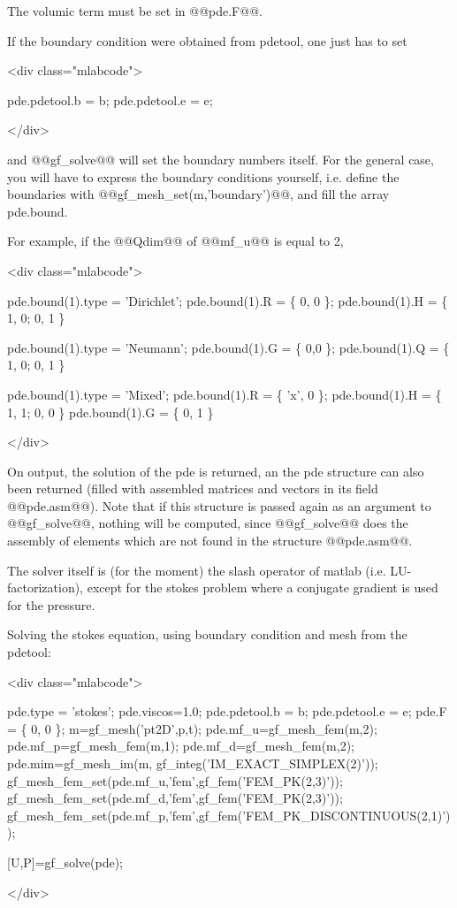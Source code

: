 \documentclass[11pt,a4paper]{article}
\newcommand{\sf}[1]{#1}
\newenvironment{mcode}{\begin{rawxml}<div class="mlabcode">\end{rawxml}\begin{example}}{\end{example}\begin{rawxml}</div>\end{rawxml}}
\newenvironment{mcode}{\begin{alltt}}{\end{alltt}}
\newcommand{\mlab}{{\sf matlab}\xspace}
\newcommand{\pdetool}{{\sf pdetool}\xspace}
\begin{document}
\begin{cmddescription}
  The volumic term must be set in @@pde.F@@.

  If the boundary condition were obtained from \pdetool, one just has to set
  \begin{mcode}
pde.pdetool.b = b;       
pde.pdetool.e = e;
  \end{mcode}
  and @@gf_solve@@ will set the boundary numbers itself.  For the
  general case, you will have to express the boundary conditions
  yourself, i.e. define the boundaries with
  @@gf_mesh_set(m,'boundary')@@, and fill the array pde.bound.

  For example, if the @@Qdim@@ of @@mf_u@@ is equal to 2,
  \begin{mcode}
pde.bound(1).type = 'Dirichlet';
pde.bound(1).R = \{ 0, 0 \};
pde.bound(1).H = \{ 1, 0; 0, 1 \} %

pde.bound(1).type = 'Neumann';
pde.bound(1).G = \{ 0,0 \};
pde.bound(1).Q = \{ 1, 0; 0, 1 \} %
    
pde.bound(1).type = 'Mixed';
pde.bound(1).R = \{ 'x', 0 \};
pde.bound(1).H = \{ 1, 1; 0, 0 \} %
pde.bound(1).G = \{ 0, 1 \} 
  \end{mcode}
  
  On output, the solution of the pde is returned, an the pde structure
  can also been returned (filled with assembled matrices and vectors
  in its field @@pde.asm@@). Note that if this structure is passed
  again as an argument to @@gf_solve@@, nothing will be computed,
  since @@gf_solve@@ does the assembly of elements which are not found
  in the structure @@pde.asm@@.
  
  The solver itself is (for the moment) the slash operator of \mlab
  (i.e. LU-factorization), except for the stokes problem where a
  conjugate gradient is used for the pressure.
\end{cmddescription}
\begin{cmdexamples}
Solving the stokes equation, using boundary condition and mesh from the \pdetool:
\begin{mcode}
pde.type = 'stokes';
pde.viscos=1.0;
pde.pdetool.b = b;       %
pde.pdetool.e = e;
pde.F = \{ 0, 0 \};   %
m=gf\_mesh('pt2D',p,t);   %
pde.mf\_u=gf\_mesh\_fem(m,2);   %
pde.mf\_p=gf\_mesh\_fem(m,1);   %
pde.mf\_d=gf\_mesh\_fem(m,2); 
pde.mim=gf\_mesh\_im(m, gf\_integ('IM\_EXACT\_SIMPLEX(2)'));
gf\_mesh\_fem\_set(pde.mf\_u,'fem',gf\_fem('FEM\_PK(2,3)'));
gf\_mesh\_fem\_set(pde.mf\_d,'fem',gf\_fem('FEM\_PK(2,3)'));
gf\_mesh\_fem\_set(pde.mf\_p,'fem',gf\_fem('FEM\_PK\_DISCONTINUOUS(2,1)'));

[U,P]=gf\_solve(pde);
\end{mcode}

\end{cmdexamples}
\end{document}
